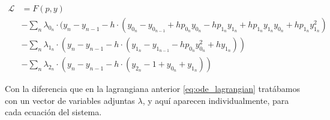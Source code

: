 \begin{align}
	\mathcal{L} & = F(p, y) \nonumber                                                                                                                                                                        \\
	            & - \sum_n \lambda_{0_n} \cdot (y_n - y_{n-1} - h \cdot (y_{0_n} - y_{0_{n-1}} + h  p_{0_n}  y_{0_n} - h  p_{1_n}  y_{1_n} + h  p_{1_n}  y_{1_n}  y_{0_n} + h  p_{1_n}  y_{1_n}^2) \nonumber \\
	            & - \sum_n \lambda_{1_n} \cdot (y_n - y_{n-1} - h \cdot (y_{1_n} - y_{1_{n-1}} - h  p_{0_n}  y_{0_n}^2 + h  y_{1_n})) \nonumber                                                              \\
	            & - \sum_n \lambda_{2_n} \cdot (y_n - y_{n-1} - h \cdot (y_{2_n} - 1 + y_{0_n} + y_{1_n}))
\end{align}

Con la diferencia que en la lagrangiana anterior \eqref{eq:ode_lagrangian}
tratábamos con un vector de variables adjuntas $\lambda$, y aquí aparecen
individualmente, para cada ecuación del sistema.
